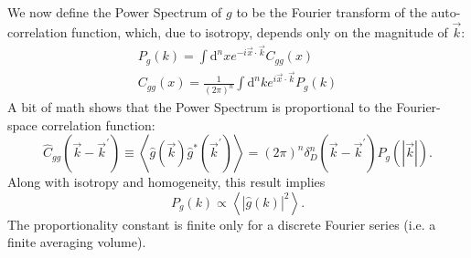 \documentclass[12pt,preprint]{aastex}			%
\newcommand{\dd}{\mathrm{d}}
\begin{document}
We now define the Power Spectrum of $g$ to be the Fourier transform of the 
auto-correlation function, which, due to isotropy, depends only on the 
magnitude of $\vec k$:
\begin{eqnarray}
  \label{pspec}
  P_g(k) = \int \dd^nx e^{-i\vec x\cdot\vec k}C_{gg}(x)\nonumber\\
  C_{gg}(x) = \frac{1}{(2\pi)^n}\int\dd^nke^{i\vec x\cdot\vec k}P_g(k)
\end{eqnarray}
A bit of math shows that the Power Spectrum is proportional to the 
Fourier-space correlation function:
\begin{equation}
  \label{pspec_corr}
  \hat C_{gg}(\vec k-\vec k^\prime) 
  \equiv \left\langle\hat g(\vec k)\hat g^*(\vec k^\prime) \right\rangle 
  =  (2\pi)^n \delta^n_D(\vec k -\vec k^\prime) P_g(|\vec k|).
\end{equation}
Along with isotropy and homogeneity, this result implies
\begin{equation}
  P_g(k) \propto \left\langle | \hat g(k)|^2 \right\rangle.
\end{equation}
The proportionality constant is finite only for a discrete Fourier series 
(i.e. a finite averaging volume).
\end{document}
